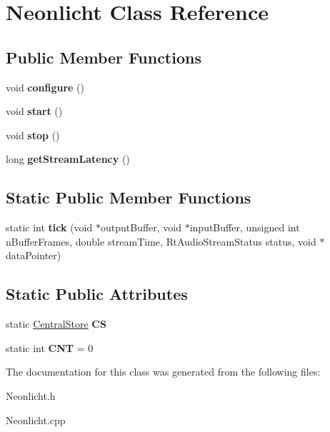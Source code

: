 \hypertarget{classNeonlicht}{}\section{Neonlicht Class Reference}
\label{classNeonlicht}
\subsection*{Public Member Functions}
\begin{DoxyCompactItemize}
\item 
void {\bfseries configure} ()\hypertarget{classNeonlicht_a32ec4c221148d01bbafd1637ced9b130}{}\label{classNeonlicht_a32ec4c221148d01bbafd1637ced9b130}

\item 
void {\bfseries start} ()\hypertarget{classNeonlicht_aae54e46be4d251ce4e062cd777994a69}{}\label{classNeonlicht_aae54e46be4d251ce4e062cd777994a69}

\item 
void {\bfseries stop} ()\hypertarget{classNeonlicht_a9d1f643b1a2394f9cd181149f7558c72}{}\label{classNeonlicht_a9d1f643b1a2394f9cd181149f7558c72}

\item 
long {\bfseries get\+Stream\+Latency} ()\hypertarget{classNeonlicht_a4354cc2fa6d7bd22e89d1314e375f54f}{}\label{classNeonlicht_a4354cc2fa6d7bd22e89d1314e375f54f}

\end{DoxyCompactItemize}
\subsection*{Static Public Member Functions}
\begin{DoxyCompactItemize}
\item 
static int {\bfseries tick} (void $\ast$output\+Buffer, void $\ast$input\+Buffer, unsigned int n\+Buffer\+Frames, double stream\+Time, Rt\+Audio\+Stream\+Status status, void $\ast$data\+Pointer)\hypertarget{classNeonlicht_a57c3e8d4154418c9efc4b48d45b732d6}{}\label{classNeonlicht_a57c3e8d4154418c9efc4b48d45b732d6}

\end{DoxyCompactItemize}
\subsection*{Static Public Attributes}
\begin{DoxyCompactItemize}
\item 
static \hyperlink{classCentralStore}{Central\+Store} {\bfseries CS}\hypertarget{classNeonlicht_a1ac3a31190125df3763a9f3d2f085d5e}{}\label{classNeonlicht_a1ac3a31190125df3763a9f3d2f085d5e}

\item 
static int {\bfseries C\+NT} = 0\hypertarget{classNeonlicht_ac86fbdabd4683feaac58b4aefbdf6695}{}\label{classNeonlicht_ac86fbdabd4683feaac58b4aefbdf6695}

\end{DoxyCompactItemize}


The documentation for this class was generated from the following files\+:\begin{DoxyCompactItemize}
\item 
Neonlicht.\+h\item 
Neonlicht.\+cpp\end{DoxyCompactItemize}

